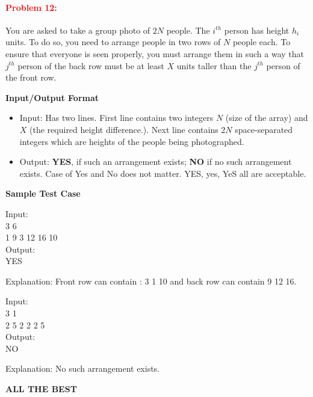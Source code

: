 \documentclass[a4paper,11pt]{article} %
\begin{document}
\paragraph{\textcolor{red}{Problem 12:}}
You are asked to take a group photo of $2N$ people. The $i^{th}$ person has height $h_i$ units. To do so, you need to arrange people in two rows of $N$ people each. To ensure that everyone is seen properly, you must arrange them in such a way that $j^{th}$ person of the back row must be at least $X$ units taller than the $j^{th}$ person of the front row.

\textbf{Input/Output Format}
\begin{itemize}
    \item  Input: Has two lines. First line contains two integers $N$ (size of the array) and $X$ (the required height difference.). Next line contains $2N$ space-separated integers which are heights of the people being photographed.
    \item  Output: \textbf{YES}, if such an arrangement exists; \textbf{NO} if no such arrangement exists. Case of Yes and No does not matter. YES, yes, YeS all are acceptable.
\end{itemize}

\textbf{Sample Test Case}

Input:\\
3 6 \\
1 9 3 12 16 10\\
Output:\\
YES
\vspace*{0.5cm}

Explanation: Front row can contain : 3 1 10 and back row can contain  9  12 16.
\vspace*{0.5cm}

Input:\\
3 1\\
2 5 2 2 2 5\\
Output:\\
NO
\vspace*{0.5cm}

Explanation: No such arrangement exists.
\vspace*{0.5cm}

\begin{center}
    \textbf{ALL THE BEST}
\end{center}
\end{document}
